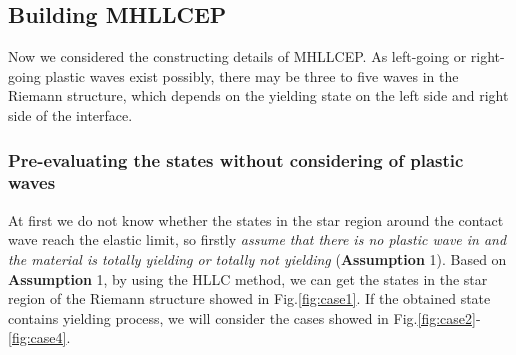 \documentclass{article}
\numberwithin{equation}{section}
\numberwithin{table}{section}
\begin{document}
\subsection{Building MHLLCEP}

Now we considered the constructing details of MHLLCEP. As left-going or right-going  plastic waves exist possibly, there may be three to five waves in the Riemann structure, which depends on the yielding state  on the left side and right side of the interface.

\subsubsection{Pre-evaluating the states without considering of plastic waves}\label{sec:case1}
At first we do not know whether the states in the star region around the contact wave reach the elastic limit, so firstly \emph{assume that there is no plastic wave in and the material is totally yielding or totally not yielding} (\textbf{Assumption} 1). Based on \textbf{Assumption} 1, by using the HLLC method, we can get the states in the star region of the Riemann structure showed in  Fig.\ref{fig:case1}. If the obtained state contains yielding process, we will consider the cases showed in Fig.\ref{fig:case2}-\ref{fig:case4}.
\end{document}
